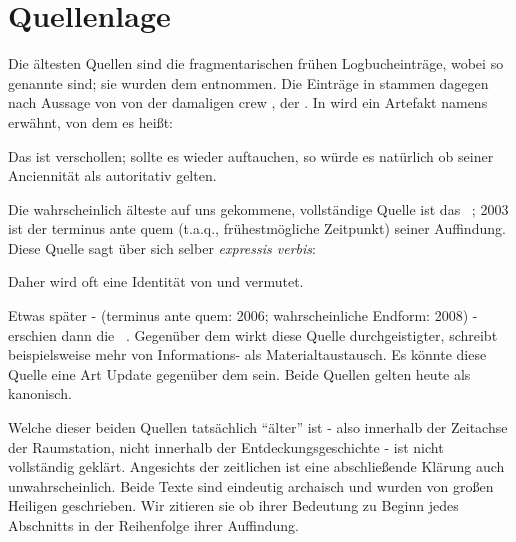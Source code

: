 \section{Quellenlage}%

Die ältesten Quellen sind die fragmentarischen frühen Logbucheinträge, wobei \cite{cbaselogbuchpre} so genannte  sind; sie wurden dem  entnommen.  Die Einträge in \cite{cbaselogbuchnow} stammen dagegen nach Aussage von \cite{cbaselogbuchpre} von der damaligen crew \cite{cbaselogbuchpre}, der . In \cite{cbaselogbuchnow} wird ein Artefakt namens  erwähnt, von dem es heißt: 

 
 Das  ist verschollen; sollte es wieder auftauchen, so würde es natürlich ob seiner Anciennität als autoritativ gelten.
 
Die wahrscheinlich älteste auf uns gekommene, vollständige Quelle ist das ~\cite{cbasestarbasemanual}; 2003 ist der terminus ante quem (t.a.q., frühestmögliche Zeitpunkt) seiner Auffindung. Diese Quelle sagt über sich selber \emph{expressis verbis}:

Daher wird oft eine Identität von  und  vermutet. %

Etwas später - (terminus ante quem: 2006; wahrscheinliche Endform: 2008) - erschien dann die ~\cite{ctour}. Gegenüber dem  wirkt diese Quelle durchgeistigter, schreibt beispielsweise mehr von Informations- als Materialtaustausch. Es könnte diese Quelle eine Art Update gegenüber dem  sein. Beide Quellen gelten heute als kanonisch.

Welche dieser beiden Quellen tatsächlich "`älter"' ist - also innerhalb der Zeitachse der Raumstation, nicht innerhalb der Entdeckungsgeschichte - ist nicht vollständig geklärt. Angesichts der zeitlichen  ist eine abschließende Klärung auch unwahrscheinlich.
Beide Texte sind eindeutig archaisch und wurden von großen Heiligen geschrieben.  Wir zitieren sie ob ihrer Bedeutung zu Beginn jedes Abschnitts in der Reihenfolge ihrer Auffindung.

